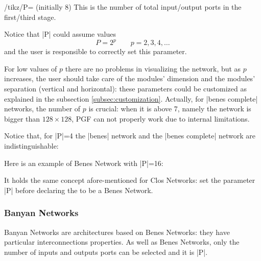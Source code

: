 \documentclass{ltxdoc}
\begin{document}
\begin{key}{/tikz/P= (initially 8)}
    This is the number of total input/output ports in the first/third stage.
\end{key}

Notice that |P| could assume values
\[P=2^p \qquad p=2,3,4,\ldots\]
and the user is responsible to correctly set this parameter.

For low values of $p$ there are no problems in visualizing the network, but as $p$ increases, the user should take care of the modules' dimension and the modules' separation (vertical and horizontal): these parameters could be customized as explained in the subsection \ref{subsec:customization}. Actually, for |benes complete| networks, the number of $p$ is crucial: when it is above 7, namely the network is bigger than $128\times 128$, PGF can not properly work due to internal limitations.

Notice that, for |P|=4 the |benes| network and the |benes complete| network are indistinguishable:
\begin{codeexample}[]
\begin{tikzpicture}
\tikzset{module size=0.5cm,
 pin length factor=0.5,
 module ysep=1}
 \node[P=4,benes] {};
 \begin{scope}[xshift=6cm]
     \node[module xsep=2.5,P=4,benes complete]{};
 \end{scope}
\end{tikzpicture}
\end{codeexample}

Here is an example of Benes Network with |P|=16:
\begin{codeexample}[]
\begin{tikzpicture}
    \node[P=16,benes] {};
\end{tikzpicture}
\end{codeexample}

It holds the same concept afore-mentioned for Clos Networks: set the parameter |P| before declaring the  to be a Benes Network.

\subsubsection{Banyan Networks}
\label{subsubsec:banyan}
Banyan Networks are architectures based on Benes Networks: they have particular interconnections properties. As well as Benes Networks, only the number of inputs and outputs ports can be selected and it is |P|.
\end{document}
